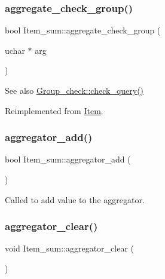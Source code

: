 \subsubsection{\texorpdfstring{aggregate\+\_\+check\+\_\+group()}{aggregate\_check\_group()}}
{\footnotesize\ttfamily bool Item\+\_\+sum\+::aggregate\+\_\+check\+\_\+group (\begin{DoxyParamCaption}\item[{uchar $\ast$}]{arg }\end{DoxyParamCaption})\hspace{0.3cm}{\ttfamily [virtual]}}

\begin{DoxySeeAlso}{See also}
\mbox{\hyperlink{group__AGGREGATE__CHECKS_ga85f98a122e6f9accf528534acb5db686}{Group\+\_\+check\+::check\+\_\+query()}} 
\end{DoxySeeAlso}


Reimplemented from \mbox{\hyperlink{classItem_ab828d3602e63ad15f5cfd8ff54339189}{Item}}.

\mbox{\label{classItem__sum_ab090330ed58167234556e1f906976c0c}} 
\subsubsection{\texorpdfstring{aggregator\+\_\+add()}{aggregator\_add()}}
{\footnotesize\ttfamily bool Item\+\_\+sum\+::aggregator\+\_\+add (\begin{DoxyParamCaption}{ }\end{DoxyParamCaption})\hspace{0.3cm}{\ttfamily [inline]}}

Called to add value to the aggregator. \mbox{\label{classItem__sum_a15e7047e85571842d5aada49784f4278}} 
\subsubsection{\texorpdfstring{aggregator\+\_\+clear()}{aggregator\_clear()}}
{\footnotesize\ttfamily void Item\+\_\+sum\+::aggregator\+\_\+clear (\begin{DoxyParamCaption}{ }\end{DoxyParamCaption})\hspace{0.3cm}{\ttfamily [inline]}}


